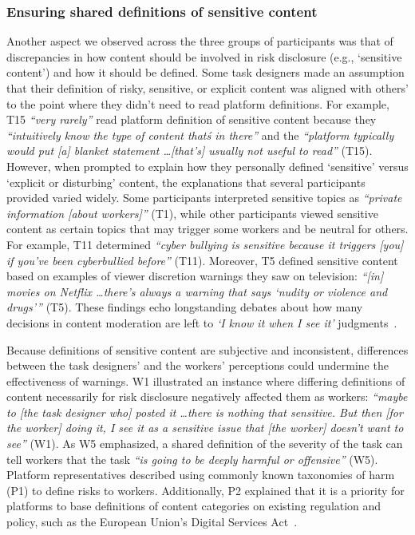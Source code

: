 \subsubsection{Ensuring shared definitions of sensitive
content}
Another aspect we observed across the three groups of participants was that of discrepancies in how content should be involved in risk disclosure (e.g., `sensitive content') and how it should be defined.
Some task designers made an assumption that their definition of risky, sensitive, or explicit content was aligned with others' to the point where they didn't need to read platform definitions. For example, T15 \textit{``very rarely''} read platform definition of sensitive content because they \textit{``intuitively know the type of content that\'s in there''} and the \textit{``platform typically would put [a] blanket statement \dots [that's] usually not useful to read''} (T15). However, when prompted to explain how they personally defined `sensitive' versus `explicit or disturbing' content, the explanations that several participants provided varied widely. Some participants interpreted sensitive topics as \textit{``private information [about workers]''} (T1), while other participants viewed sensitive content as certain topics that may trigger some workers and be neutral for others. For example, T11 determined \textit{``cyber bullying is sensitive because it triggers [you] if you've been cyberbullied before''} (T11). Moreover, T5 defined sensitive content based on examples of viewer discretion warnings they saw on television: \textit{``[in] movies on Netflix \dots there's always a warning that says `nudity or violence and drugs'''} (T5). These findings echo longstanding debates about how many decisions in content moderation are left to \textit{`I know it when I see it'} judgments~\cite{gillespie2020expanding, ohioknow}.

Because definitions of sensitive content are subjective and inconsistent, differences between the task designers' and the workers' perceptions could undermine the effectiveness of warnings. 
W1 illustrated an instance where differing definitions of content necessarily for risk disclosure negatively affected them as workers: \textit{``maybe to [the task designer who] posted it \dots there is nothing that sensitive. But then [for the worker] doing it, I see it as a sensitive issue that [the worker] doesn't want to see''} (W1). As W5 emphasized, a shared definition of the severity of the task can tell workers that the task \textit{``is going to be deeply harmful or offensive''} (W5). Platform representatives described using commonly known taxonomies of harm (P1) to define risks to workers. Additionally, P2 explained that it is a priority for platforms to base definitions of content categories on existing regulation and policy, such as the European Union's Digital Services Act~\cite{EU-DSA-2022}.


